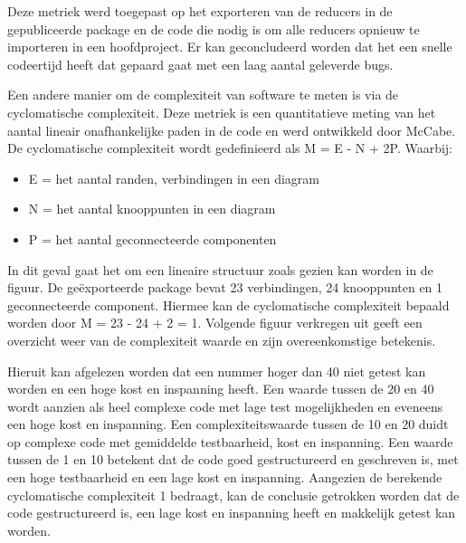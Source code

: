 Deze metriek werd toegepast op het exporteren van de reducers in de gepubliceerde package en de code die nodig is om alle reducers opnieuw te importeren in een hoofdproject. Er kan geconcludeerd worden dat het een snelle codeertijd heeft dat gepaard gaat met een laag aantal geleverde bugs.

Een andere manier om de complexiteit van software te meten is via de cyclomatische complexiteit. Deze metriek is een quantitatieve meting van het aantal lineair onafhankelijke paden in de code en werd ontwikkeld door McCabe. 
De cyclomatische complexiteit wordt gedefinieerd als M = E - N + 2P.\newline
Waarbij: 
\begin{itemize}
	\item E = het aantal randen, verbindingen in een diagram
	\item N = het aantal knooppunten in een diagram
	\item P = het aantal geconnecteerde componenten
\end{itemize}
\autocite{cyclomatic}

In dit geval gaat het om een lineaire structuur zoals gezien kan worden in de figuur. De geëxporteerde package bevat 23 verbindingen, 24 knooppunten en 1 geconnecteerde component. Hiermee kan de cyclomatische complexiteit bepaald worden door M = 23 - 24 + 2 = 1. Volgende figuur verkregen uit \textcite{complexitynumbers} geeft een overzicht weer van de complexiteit waarde en zijn overeenkomstige betekenis. 

Hieruit kan afgelezen worden dat een nummer hoger dan 40 niet getest kan worden en een hoge kost en inspanning heeft. Een waarde tussen de 20 en 40 wordt aanzien als heel complexe code met lage test mogelijkheden en eveneens een hoge kost en inspanning. Een complexiteitswaarde tussen de 10 en 20 duidt op complexe code met gemiddelde testbaarheid, kost en inspanning. Een waarde tussen de 1 en 10 betekent dat de code goed gestructureerd en geschreven is, met een hoge testbaarheid en een lage kost en inspanning. Aangezien de berekende cyclomatische complexiteit 1 bedraagt, kan de conclusie getrokken worden dat de code gestructureerd is, een lage kost en inspanning heeft en makkelijk getest kan worden.


